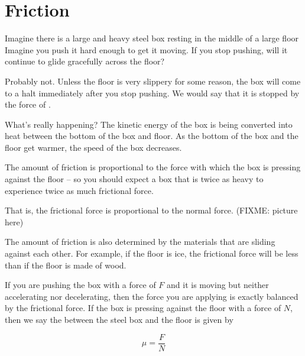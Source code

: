 \chapter{Friction}

Imagine there is a large and heavy steel box resting in the middle of a large floor   Imagine you push it hard enough to get it moving.   If you stop pushing,  will it continue to glide gracefully across the floor? 

Probably not.  Unless the floor is very slippery for some reason,  the box will come to a halt immediately after you stop pushing.  We would say that it is stopped by the force of . 

What's really happening?  The kinetic energy of the box is being converted into heat 
between the bottom of the box and floor.   As the bottom of the box and the floor get warmer,  the speed of the box decreases.

The amount of friction is proportional to the force with which the box is pressing against the floor -- so you should expect a box that is twice as heavy to experience twice as much frictional force.

That is,  the frictional force is proportional to the normal force.  (FIXME: picture here)

The amount of friction is also determined by the materials that are sliding against each other.  For example,  if the floor is ice,  the frictional force will be less than if the floor is made of wood. 

If you are pushing the box with a force of $F$ and it is moving but neither accelerating nor decelerating,  then the force you are applying is exactly balanced by the frictional force.  If the box is pressing against the floor with a force of $N$, then we say the  between the steel box and the floor is given by

$$\mu = \frac{F}{N}$$

